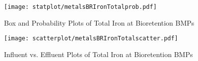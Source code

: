         \begin{figure}[hb]   %
            \centering
            \texttt{[image: statplot/metalsBRIronTotalprob.pdf]}
            \caption{Box and Probability Plots of Total Iron at Bioretention BMPs}
        \end{figure}         %
        
        
        \begin{figure}[hb]   %
            \centering
            \texttt{[image: scatterplot/metalsBRIronTotalscatter.pdf]}
            \caption{Influent vs. Effluent Plots of Total Iron at Bioretention BMPs}
        \end{figure}         %
        \clearpage
        